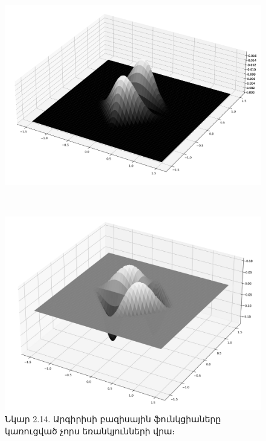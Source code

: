\documentclass[fleqn, bachelor,subf,12pt,notitlepage]{article}
\begin{document}
\begin{figure}[H]
\begin{minipage}[b]{0.4\textwidth}
  \end{minipage}
\hfill
  \begin{minipage}[b]{0.4\textwidth}
    \includegraphics[width=\textwidth]{images/argyris_basis_fyy_value}
  \end{minipage}
\\
  \begin{minipage}[b]{0.4\textwidth}
    \includegraphics[width=\textwidth]{images/argyris_basis_fn_value}
  \end{minipage}
\captionsetup{labelformat=empty}
\caption{Նկար 2.14. Արգիրիսի բազիսային ֆունկցիաները կառուցված չորս եռանկյունների վրա։}
\end{figure}

\newpage
\section*{}
\setcounter{equation}{0}
\end{document}
